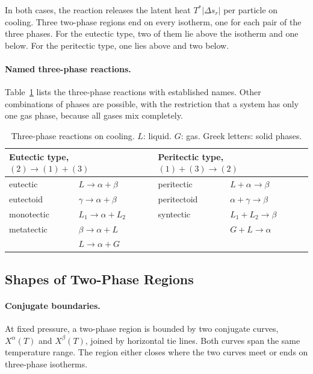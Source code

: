 In both cases, the reaction releases the latent heat $T^\ast|\Delta s_r|$ per
particle on cooling. Three two-phase regions end on every isotherm, one for
each pair of the three phases. For the eutectic type, two of them lie above
the isotherm and one below. For the peritectic type, one lies above and two
below.

\paragraph{Named three-phase reactions.}
Table~\ref{tab:three-phase} lists the three-phase reactions with
established names. Other combinations of phases are possible, with the
restriction that a system has only one gas phase, because all gases mix
completely.
\begin{table}[htbp]
\centering
\caption{Three-phase reactions on cooling. $L$: liquid. $G$: gas. Greek
letters: solid phases.}
\label{tab:three-phase}
\renewcommand{\arraystretch}{1.3}
\begin{tabular}{llll}
    \multicolumn{2}{l}{Eutectic type, $(2)\to(1)+(3)$}
    & \multicolumn{2}{l}{Peritectic type, $(1)+(3)\to(2)$} \\ \hline
    eutectic & $L\to\alpha+\beta$ & peritectic & $L+\alpha\to\beta$ \\
    eutectoid & $\gamma\to\alpha+\beta$ & peritectoid & $\alpha+\gamma\to\beta$ \\
    monotectic & $L_1\to\alpha+L_2$ & syntectic & $L_1+L_2\to\beta$ \\
    metatectic & $\beta\to\alpha+L$ & & $G+L\to\alpha$ \\
     & $L\to\alpha+G$ & & \\
\end{tabular}
\end{table}

\subsection{Shapes of Two-Phase Regions}

\paragraph{Conjugate boundaries.}
At fixed pressure, a two-phase region is bounded by two conjugate curves,
$X^\alpha(T)$ and $X^\beta(T)$, joined by horizontal tie lines. Both curves
span the same temperature range. The region either closes where the two
curves meet or ends on three-phase isotherms.

